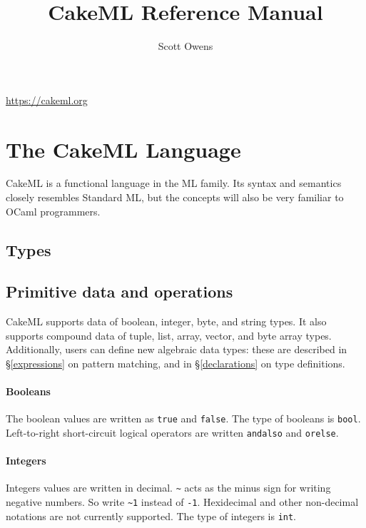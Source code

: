 \documentclass{article}
\title{CakeML Reference Manual}
\author{Scott Owens}
\begin{document}
\sloppy
\maketitle
\vspace{-24pt}
\begin{center}\url{https://cakeml.org}\end{center}
\vspace{12pt}

\section{The CakeML Language}

CakeML is a functional language in the ML family. Its syntax and semantics closely resembles Standard ML, but the concepts will also be very familiar to OCaml programmers.

\subsection{Types}



\subsection{Primitive data and operations}

CakeML supports data of boolean, integer, byte, and string types. It also supports compound data of tuple, list, array, vector, and byte array types. Additionally, users can define new algebraic data types: these are described in  \S\ref{expressions} on pattern matching, and in \S\ref{declarations} on type definitions.

\paragraph{Booleans} The boolean values are written as \texttt{true} and \texttt{false}. The type of booleans is \texttt{bool}. Left-to-right short-circuit logical operators are written \texttt{andalso} and \texttt{orelse}.

\paragraph{Integers} Integers values are written in decimal. \verb|~| acts as the minus sign for writing negative numbers. So write \verb|~1| instead of \verb|-1|. Hexidecimal and other non-decimal notations are not currently supported. The type of integers is \texttt{int}.
\end{document}

